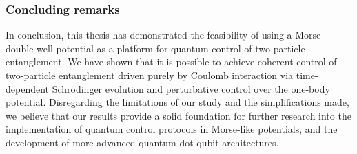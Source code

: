 \documentclass{subfiles}
\begin{document}
\subsubsection*{Concluding remarks}
In conclusion, this thesis has demonstrated the feasibility of using a Morse double-well potential as a platform for quantum control of two-particle entanglement. We have shown that it is possible to achieve coherent control of two-particle entanglement driven purely by Coulomb interaction via time-dependent Schrödinger evolution and perturbative control over the one-body potential. Disregarding the limitations of our study and the simplifications made, we believe that our results provide a solid foundation for further research into the implementation of quantum control protocols in Morse-like potentials, and the development of more advanced quantum-dot qubit architectures. 
\end{document}
